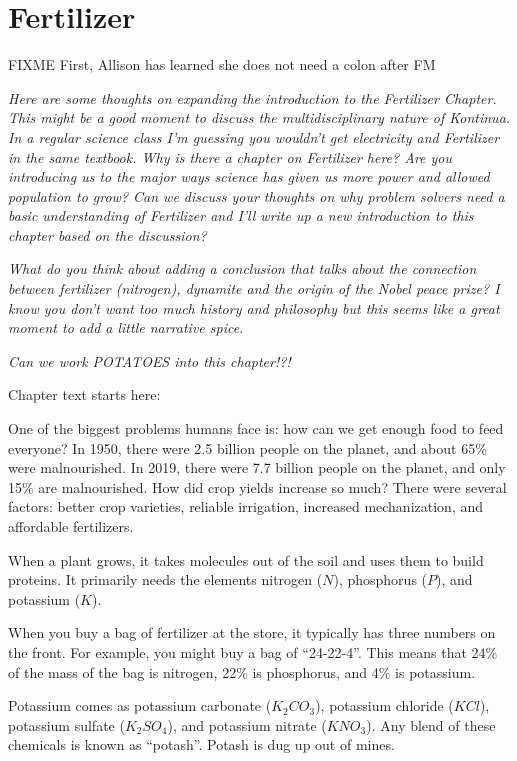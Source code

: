 \chapter{Fertilizer}

FIXME 
First, Allison has learned she does not need a colon after FM

\textit{Here are some thoughts on expanding the introduction to the Fertilizer Chapter. This might be a good moment to discuss the multidisciplinary nature of Kontinua. 
In a regular science class I'm guessing you wouldn't get electricity and Fertilizer in the same textbook. Why is there a chapter on Fertilizer here? Are you introducing us to the major ways science has given us more power and allowed population to grow? Can we discuss your thoughts on why problem solvers need a basic understanding of Fertilizer and I'll write up a new introduction to this chapter based on the discussion?}


\textit{What do you think about adding a conclusion that talks about the connection between fertilizer (nitrogen), dynamite and the origin of the Nobel peace prize? I know you don't want too much history and philosophy but this seems like a great moment to add a little narrative spice}.

\textit{Can we work POTATOES into this chapter!?!}

Chapter text starts here: 

One of the biggest problems humans face is: how can we get enough food to feed everyone?
In 1950, there were 2.5 billion people on the planet, and about 65\%
were malnourished. In 2019, there were 7.7 billion people on the
planet, and only 15\% are malnourished. How did crop yields increase
so much? There were several factors: better crop varieties,
reliable irrigation, increased mechanization, and affordable fertilizers.

When a plant grows, it takes molecules out of the soil and uses them
to build proteins. It primarily needs the elements nitrogen ($N$),
phosphorus ($P$), and potassium ($K$).  

When you buy a bag of fertilizer at the store, it typically has
three numbers on the front.  For example, you might buy a bag of
``24-22-4''.  This means that 24\% of the mass of the bag is nitrogen,
22\% is phosphorus, and 4\% is potassium.

Potassium comes as potassium carbonate ($K_2CO_3$), potassium chloride
($KCl$), potassium sulfate ($K_2 SO_4$), and potassium nitrate
($KNO_3$). Any blend of these chemicals is known as ``potash''. Potash
is dug up out of mines. 


